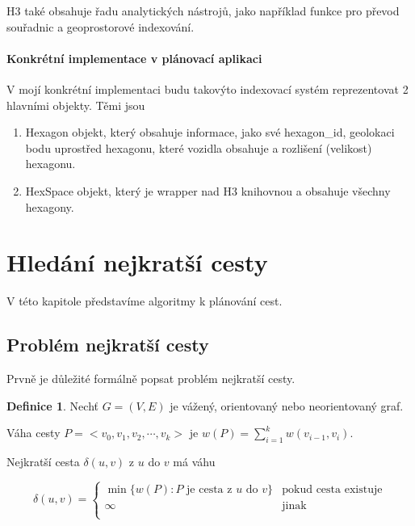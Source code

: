 \documentclass[thesis=M,czech]{FITthesis}[2019/12/23]
\theoremstyle{plain}
\theoremstyle{definition}
\newtheorem{defn}[thm]{Definice} %
\begin{document}
H3 také obsahuje řadu analytických nástrojů, jako například funkce pro převod souřadnic a geoprostorové indexování.





\paragraph{Konkrétní implementace v plánovací aplikaci}

V mojí konkrétní implementaci budu takovýto indexovací systém reprezentovat 2 hlavními objekty. Těmi jsou 

\begin{enumerate}

	\item Hexagon objekt, který obsahuje informace, jako své hexagon\_id, geolokaci bodu uprostřed hexagonu, které vozidla obsahuje a rozlišení (velikost) hexagonu.

	\item HexSpace objekt, který je wrapper nad H3 knihovnou a obsahuje všechny hexagony.


\end{enumerate}




\section{Hledání nejkratší cesty}

V této kapitole představíme algoritmy k plánování cest.


\subsection{Problém nejkratší cesty}

Prvně je důležité formálně popsat problém nejkratší cesty. 

\begin{defn}\label{thm:graf}
	Nechť $G = (V,E)$ je vážený, orientovaný nebo neorientovaný graf. 

	Váha cesty $P = <v_0,v_1,v_2, \cdots, v_k>$ je $w(P) =
	  \sum_{i=1}^k w(v_{i-1},v_i)$. 
	
	Nejkratší cesta  $\delta(u,v)$ z $u$ do $v$ má váhu
	  
	  \[ \delta(u,v) = \left\{ \begin{array}{ll}
					\min\{w(P): \mbox{$P$ je cesta z $u$ do $v$}\} & \mbox{pokud cesta existuje} \\
					\infty                                     & \mbox{jinak} \\
				  \end{array} \right. \]
								
				\cite{spp-def}
	
	
\end{defn}
	
\end{document}
